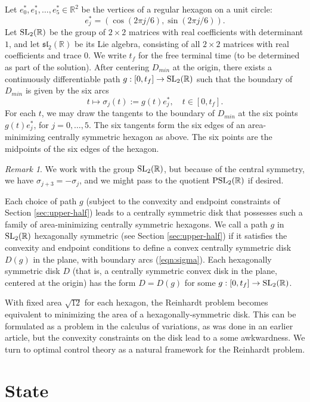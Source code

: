 \documentclass{article}
\theoremstyle{remark}
\newtheorem{remark}[equation]{Remark}%
\newcommand{\ring}[1]{\mathbb{#1}}
\newcommand{\op}[1]{\hbox{#1}}
\def\sl{\mathfrak{sl}_2(\ring{R})}
\def\SL{\op{SL}_2(\ring{R})}
\def\DR{D_{min}}
\newcommand\ee[1]{e_{#1}^*}
\begin{document}
Let $\ee{0},\ee{1},\ldots,\ee{5}\in\ring{R}^2$ be the vertices of a
regular hexagon on  a unit circle:
\[
\ee{j} = (\cos(2\pi j/6),\sin(2\pi j/6)).
\]
Let $\SL$ be the group of $2\times 2$ matrices with real coefficients
with determinant $1$, and let $\sl$ be its Lie algebra, consisting of
all $2\times 2$ matrices with real coefficients and trace $0$.  We
write $t_f$ for the free terminal time (to be determined as part of
the solution).  After centering $\DR$ at the origin, there exists a
continuously differentiable path $g:[0,t_f]\to \SL$ such that the
boundary of $\DR$ is given by the six arcs
\begin{equation}\label{eqn:sigma}
t\mapsto \sigma_j(t):= g(t) \ee{j}, \quad t \in [0,t_f].
\end{equation}
For each $t$, we may draw the tangents to the boundary of $\DR$ at the
six points $g(t) \ee{j}$, for $ j=0,\ldots,5$.  The six tangents form
the six edges of an area-minimizing centrally symmetric hexagon as
above.  The six points are the midpoints of the six edges of the
hexagon.

\begin{remark} We work with the group $\SL$, but because of the
  central symmetry, we have $\sigma_{j+3}=-\sigma_j$, and we might pass to the
  quotient $\op{PSL}_2(\ring{R})$ if desired.
\end{remark}

Each choice of path $g$ (subject to the convexity and endpoint
constraints of Section \ref{sec:upper-half}) leads to a centrally
symmetric disk that possesses such a family of area-minimizing
centrally symmetric hexagons.  We call a path $g$ in $\SL$ hexagonally
symmetric (see Section \ref{sec:upper-half}) if it satisfies the
convexity and endpoint conditions to define a convex centrally
symmetric disk $D(g)$ in the plane, with boundary arcs
(\ref{eqn:sigma}).  Each hexagonally symmetric disk $D$ (that is, a
centrally symmetric convex disk in the plane, centered at the origin)
has the form $D=D(g)$ for some $g:[0,t_f]\to\SL$.

With fixed area $\sqrt{12}$ for each hexagon, the Reinhardt problem
becomes equivalent to minimizing the area of a hexagonally-symmetric disk.  This
can be formulated as a problem in the calculus of variations, as was
done in an earlier article, but the convexity constraints on the disk
lead to a some awkwardness.  We turn to optimal control theory as a
natural framework for the Reinhardt problem.

\section{State}
\end{document}

